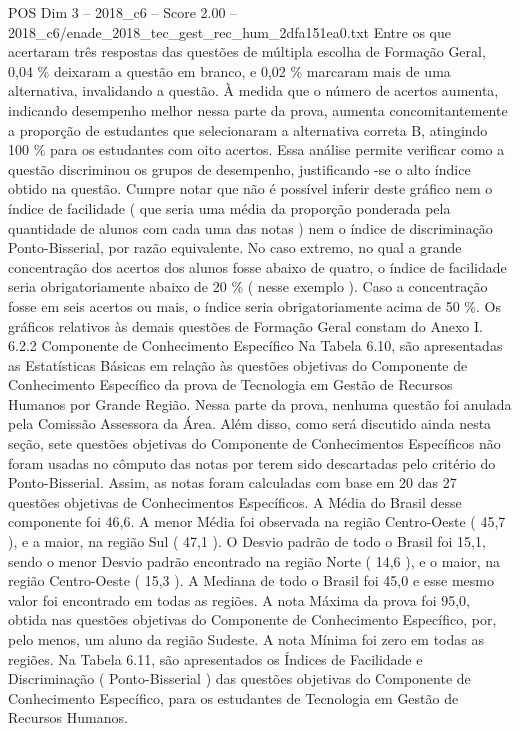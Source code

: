 \begin{textsample}{POS Dim 3 – 2018\_c6 – Score 2.00 – 2018\_c6/enade\_2018\_tec\_gest\_rec\_hum\_2dfa151ea0.txt}
Entre os que acertaram três respostas das questões de múltipla escolha de Formação Geral, 0,04 \% deixaram a questão em branco, e 0,02 \% marcaram mais de uma alternativa, invalidando a questão.
À medida que o número de acertos aumenta, indicando desempenho melhor nessa parte da prova, aumenta concomitantemente a proporção de estudantes que selecionaram a alternativa correta B, atingindo 100 \% para os estudantes com oito acertos.
Essa análise permite verificar como a questão discriminou os grupos de desempenho, justificando -se o alto índice obtido na questão.
Cumpre notar que não é possível inferir deste gráfico nem o índice de facilidade ( que seria uma média da proporção ponderada pela quantidade de alunos com cada uma das notas ) nem o índice de discriminação Ponto-Bisserial, por razão equivalente.
No caso extremo, no qual a grande concentração dos acertos dos alunos fosse abaixo de quatro, o índice de facilidade seria obrigatoriamente abaixo de 20 \% ( nesse exemplo ).
Caso a concentração fosse em seis acertos ou mais, o índice seria obrigatoriamente acima de 50 \%.
Os gráficos relativos às demais questões de Formação Geral constam do Anexo I. 6.2.2 Componente de Conhecimento Específico Na Tabela 6.10, são apresentadas as Estatísticas Básicas em relação às questões objetivas do Componente de Conhecimento Específico da prova de Tecnologia em Gestão de Recursos Humanos por Grande Região.
Nessa parte da prova, nenhuma questão foi anulada pela Comissão Assessora da Área.
Além disso, como será discutido ainda nesta seção, sete questões objetivas do Componente de Conhecimentos Específicos não foram usadas no cômputo das notas por terem sido descartadas pelo critério do Ponto-Bisserial.
Assim, as notas foram calculadas com base em 20 das 27 questões objetivas de Conhecimentos Específicos.
A Média do Brasil desse componente foi 46,6.
A menor Média foi observada na região Centro-Oeste ( 45,7 ), e a maior, na região Sul ( 47,1 ).
O Desvio padrão de todo o Brasil foi 15,1, sendo o menor Desvio padrão encontrado na região Norte ( 14,6 ), e o maior, na região Centro-Oeste ( 15,3 ).
A Mediana de todo o Brasil foi 45,0 e esse mesmo valor foi encontrado em todas as regiões.
A nota Máxima da prova foi 95,0, obtida nas questões objetivas do Componente de Conhecimento Específico, por, pelo menos, um aluno da região Sudeste.
A nota Mínima foi zero em todas as regiões.
Na Tabela 6.11, são apresentados os Índices de Facilidade e Discriminação ( Ponto-Bisserial ) das questões objetivas do Componente de Conhecimento Específico, para os estudantes de Tecnologia em Gestão de Recursos Humanos.

\end{textsample}
